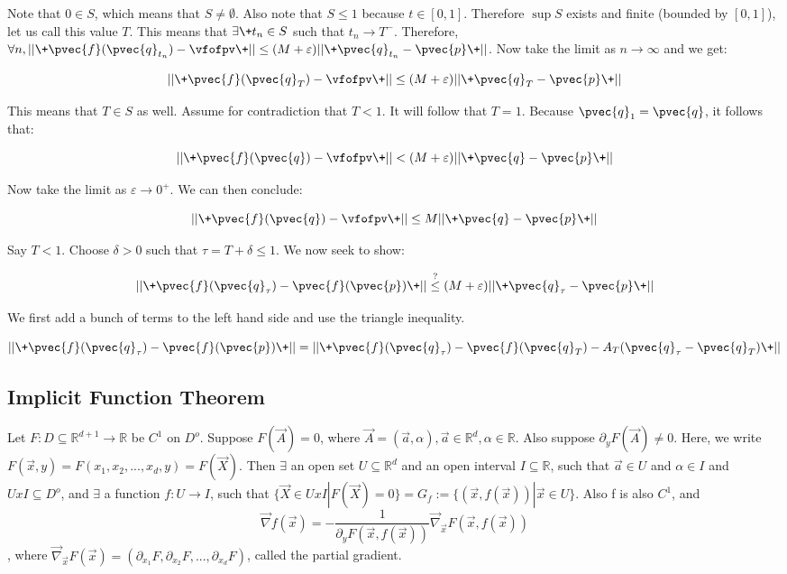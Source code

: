 \documentclass[11 pt, twoside]{article}
\begin{document}
Note that $0 \in S$, which means that $S \neq \emptyset$. Also note that $S \leq
1$ because $t \in [0, 1]$. Therefore $\sup S$ exists and finite (bounded by $[0,
1]$), let us call this value $T$. This means that $\exists\+ t_n \in S$ such
that $t_n \to T^-$. Therefore, $\forall n, ||\+\pvec{f}(\pvec{q}_{t_n}) -
\vfofpv\+|| \leq (M + \varepsilon) ||\+\pvec{q}_{t_n} - \pvec{p}\+||$. Now take the
limit as $n \to \infty$ and we get:

$$ ||\+\pvec{f}(\pvec{q}_T) - \vfofpv\+|| \leq (M + \varepsilon) ||\+\pvec{q}_T
- \pvec{p}\+||$$

This means that $T \in S$ as well. Assume for contradiction that $T < 1$. It
will follow that $T = 1$. Because $\pvec{q}_1 = \pvec{q}$, it follows that:

$$ ||\+\pvec{f}(\pvec{q}) - \vfofpv\+|| < (M + \varepsilon) ||\+\pvec{q} - \pvec{p}\+||$$

Now take the limit as $\varepsilon \to 0^+$. We can then conclude:

$$ ||\+\pvec{f}(\pvec{q}) - \vfofpv\+|| \leq M ||\+\pvec{q} - \pvec{p}\+||$$

Say $T < 1$. Choose $\delta > 0$ such that $\tau = T + \delta \leq 1$. We now
seek to show:

$$ ||\+\pvec{f}(\pvec{q}_{\tau}) - \pvec{f}(\pvec{p})\+|| \overset{?}{\leq} (M +
\varepsilon) ||\+\pvec{q}_{\tau} - \pvec{p}\+||$$

We first add a bunch of terms to the left hand side and use the triangle
inequality.

$$ ||\+\pvec{f}(\pvec{q}_{\tau}) - \pvec{f}(\pvec{p})\+|| =
||\+\pvec{f}(\pvec{q}_{\tau}) - \pvec{f}(\pvec{q}_T) - A_T(\pvec{q}_{\tau} -
\pvec{q}_T)\+||$$


\subsection{Implicit Function Theorem}
Let $F: D \subseteq \mathbb{R}^{d+1} \to \mathbb{R}$ be $C^1$ on $D^o$. Suppose $F(\vec{A}) = 0$, where $\vec{A} = (\vec{a}, \alpha), \vec{a} \in \mathbb{R}^d, \alpha \in \mathbb{R}$. Also suppose $\partial_yF(\vec{A}) \neq 0$. Here, we write $F(\vec{x}, y) = F(x_1, x_2, ..., x_d, y) = F(\vec{X})$. Then $\exists$ an open set $U \subseteq \mathbb{R}^d$ and an open interval $I \subseteq \mathbb{R}$, such that $\vec{a} \in U$ and $\alpha \in I$ and $U x I \subseteq D^o$, and $\exists$ a function $f: U \to I$, such that $\{\vec{X} \in U x I|F(\vec{X}) = 0\} = G_f := \{(\vec{x}, f(\vec{x}))|\vec{x} \in U\}$. Also f is also $C^1$, and $$\vec{\nabla}f(\vec{x}) = -\frac{1}{\partial_yF(\vec{x}, f(\vec{x}))}\vec{\nabla}_\vec{x}F(\vec{x}, f(\vec{x}))$$, where $\vec{\nabla}_\vec{x}F(\vec{x}) = (\partial_{x_1}F, \partial_{x_2}F, ..., \partial_{x_d}F)$, called the partial gradient.
\end{document}
